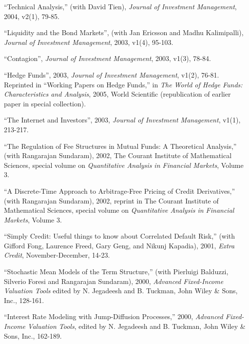 \documentclass{article}
\begin{document}
\begin{etaremune}
\item ``Technical Analysis,'' (with David Tien),
{\it Journal of Investment Management}, 2004, v2(1), 79-85.

\item ``Liquidity and the Bond Markets'', (with Jan
Ericsson and Madhu Kalimipalli), {\it Journal of
Investment Management}, 2003, v1(4), 95-103.

\item ``Contagion'', {\it Journal of
Investment Management}, 2003, v1(3), 78-84.

\item ``Hedge Funds'', 2003, {\it Journal of
Investment Management}, v1(2), 76-81. Reprinted in
``Working Papers on Hedge Funds,'' in 
{\it The World of Hedge Funds: Characteristics and Analysis}, 
2005, World Scientific (republication of earlier paper in special
collection). 

\item ``The Internet and Investors'', 2003, {\it Journal 
of Investment Management}, v1(1), 213-217.

\item ``The Regulation of Fee Structures in Mutual Funds: A
Theoretical Analysis,'' (with Rangarajan Sundaram), 2002, 
The Courant Institute of Mathematical
Sciences, special volume on {\it Quantitative Analysis in Financial
Markets}, Volume 3. 

\item 
``A Discrete-Time Approach to Arbitrage-Free Pricing of Credit
Derivatives,'' (with Rangarajan Sundaram), 2002,
reprint in The Courant Institute of Mathematical
Sciences, special volume on {\it Quantitative Analysis in Financial
Markets}, Volume 3. 

\item ``Simply Credit: Useful things to know about Correlated
Default Risk,'' (with Gifford Fong, Laurence Freed, Gary Geng, and
Nikunj Kapadia), 2001, {\it Extra Credit}, November-December, 14-23.

\item
``Stochastic Mean Models of the Term Structure,''
(with Pierluigi Balduzzi, Silverio Foresi and Rangarajan Sundaram), 
2000, {\it Advanced Fixed-Income Valuation Tools}
edited by N. Jegadeesh and B. Tuckman,
John Wiley \& Sons, Inc., 128-161.

\item
``Interest Rate Modeling with Jump-Diffusion Processes,'' 2000,
{\it Advanced Fixed-Income Valuation Tools}, edited by
N. Jegadeesh and B. Tuckman, John Wiley \& Sons, Inc., 162-189.


\end{etaremune}
\end{document}
